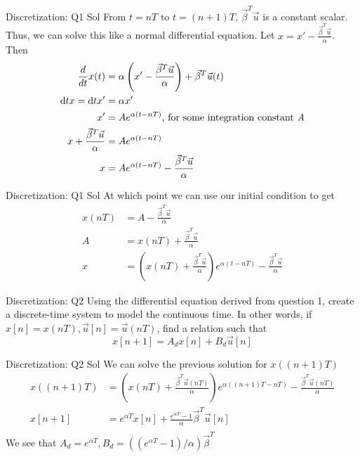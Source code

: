 \documentclass{beamer}
\begin{document}
\begin{frame}{Discretization: Q1 Sol}
From $t = nT$ to $t = (n + 1)T$, $\vec{\beta}^T \vec{u}$ is a constant scalar. Thus, we can solve this like a normal differential equation. Let $x = x' - \frac{\vec \beta^T \vec u}{\alpha}$. Then
\begin{align*}
\frac{d}{dt} x(t) &= \alpha \left(x' - \frac{\vec \beta^T \vec u}{\alpha}\right) + \vec{\beta}^T \vec u(t) \\
\mathrm d{t}x = \mathrm d{t}x' &= \alpha x' \\
x' &= A e^{\alpha (t - nT)} \text{, for some integration constant \em{A}} \\
x + \frac{\vec \beta^T \vec u}{\alpha} &= A e^{\alpha (t - nT)} \\
x &= A e^{\alpha (t - nT)} - \frac{\vec \beta^T \vec u}{\alpha}
\end{align*}
\end{frame}
\begin{frame}{Discretization: Q1 Sol}
At which point we can use our initial condition to get
\begin{align*}
x(nT) &= A - \frac{\vec \beta^T \vec u}{\alpha} \\
A &= x(nT) + \frac{\vec \beta^T \vec u}{\alpha} \\
x &= \left( x(nT) + \frac{\vec \beta^T \vec u}{\alpha} \right) e^{\alpha (t - nT)} - \frac{\vec \beta^T \vec u}{\alpha}
\end{align*}
\end{frame}

\begin{frame}{Discretization: Q2}
Using the differential equation derived from question 1, create a discrete-time system to model the continuous time. In other words, if $x[n] = x(nT), \vec{u}[n] = \vec{u}(nT)$, find a relation such that
\[ x[n + 1] = A_d x[n] + B_d \vec{u}[n] \]
\end{frame}

\begin{frame}{Discretization: Q2 Sol}
We can solve the previous solution for $x((n + 1)T)$
\begin{align*}
x((n + 1)T) &= \left( x(nT) + \frac{\vec \beta^T \vec u(nT)}{\alpha} \right) e^{\alpha ((n + 1)T - nT)} - \frac{\vec \beta^T \vec u(nT)}{\alpha} \\
x[n + 1] &= e^{\alpha T} x[n] + \frac{e^{\alpha T} - 1}{\alpha} \vec{\beta}^T \vec{u}[n] \\
\end{align*}
We see that $A_d = e^{\alpha T}, B_d = ((e^{\alpha T} - 1) / \alpha) \vec{\beta}^T$
\end{frame}
\end{document}
